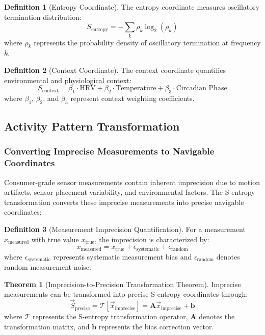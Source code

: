 \documentclass[12pt,a4paper]{article}
\theoremstyle{definition}
\newtheorem{definition}{Definition}[section]
\newtheorem{theorem}{Theorem}[section]
\begin{document}
\begin{definition}[Entropy Coordinate]
The entropy coordinate measures oscillatory termination distribution:
\begin{equation}
S_{\text{entropy}} = -\sum_{k} \rho_k \log_2(\rho_k)
\end{equation}
where $\rho_k$ represents the probability density of oscillatory termination at frequency $k$.
\end{definition}

\begin{definition}[Context Coordinate]
The context coordinate quantifies environmental and physiological context:
\begin{equation}
S_{\text{context}} = \beta_1 \cdot \text{HRV} + \beta_2 \cdot \text{Temperature} + \beta_3 \cdot \text{Circadian Phase}
\end{equation}
where $\beta_1$, $\beta_2$, and $\beta_3$ represent context weighting coefficients.
\end{definition}

\subsection{Activity Pattern Transformation}

\subsubsection{Converting Imprecise Measurements to Navigable Coordinates}

Consumer-grade sensor measurements contain inherent imprecision due to motion artifacts, sensor placement variability, and environmental factors. The S-entropy transformation converts these imprecise measurements into precise navigable coordinates:

\begin{definition}[Measurement Imprecision Quantification]
For a measurement $x_{\text{measured}}$ with true value $x_{\text{true}}$, the imprecision is characterized by:
\begin{equation}
x_{\text{measured}} = x_{\text{true}} + \epsilon_{\text{systematic}} + \epsilon_{\text{random}}
\end{equation}
where $\epsilon_{\text{systematic}}$ represents systematic measurement bias and $\epsilon_{\text{random}}$ denotes random measurement noise.
\end{definition}

\begin{theorem}[Imprecision-to-Precision Transformation Theorem]
Imprecise measurements can be transformed into precise S-entropy coordinates through:
\begin{equation}
\vec{S}_{\text{precise}} = \mathcal{T}[\vec{x}_{\text{imprecise}}] = \mathbf{A} \vec{x}_{\text{imprecise}} + \mathbf{b}
\end{equation}
where $\mathcal{T}$ represents the S-entropy transformation operator, $\mathbf{A}$ denotes the transformation matrix, and $\mathbf{b}$ represents the bias correction vector.
\end{theorem}
\end{document}
